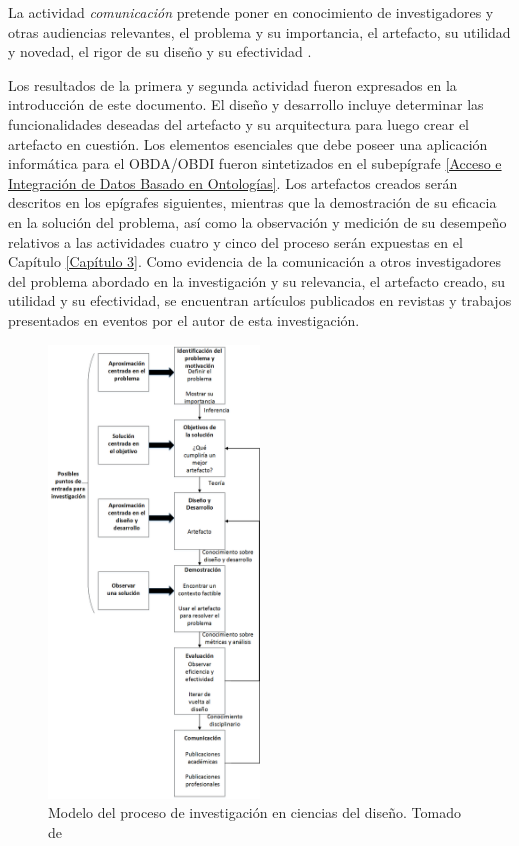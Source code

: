 La actividad \textit{comunicación} pretende poner en conocimiento de investigadores y otras audiencias relevantes, el problema y su importancia, el artefacto, su utilidad y novedad, el rigor de su diseño y su efectividad \citep{Peffers2006}.

Los resultados de la primera y segunda actividad fueron expresados en la introducción de este documento. El diseño y desarrollo incluye determinar las funcionalidades deseadas del artefacto y su arquitectura para luego crear el artefacto en cuestión. Los elementos esenciales que debe poseer una aplicación informática para el OBDA/OBDI fueron sintetizados en el subepígrafe \ref{Acceso e Integración de Datos Basado en Ontologías}. Los artefactos creados serán descritos en los epígrafes siguientes, mientras que la demostración de su eficacia en la solución del problema, así como la observación y medición de su desempeño relativos a las actividades cuatro y cinco del proceso serán expuestas en el Capítulo \ref{Capítulo 3}. Como evidencia de la comunicación a otros investigadores del problema abordado en la investigación y su relevancia, el artefacto creado, su utilidad y su efectividad, se encuentran artículos publicados en revistas y trabajos presentados en eventos por el autor de esta investigación.

\begin{figure}
\begin{center}
	\includegraphics[width=0.5\textwidth]{img/DSRPmodel.png}
\end{center}
\caption{Modelo del proceso de investigación en ciencias del diseño. Tomado de \citep{Peffers2006}}
\label{fig: dsrp}
\end{figure}

